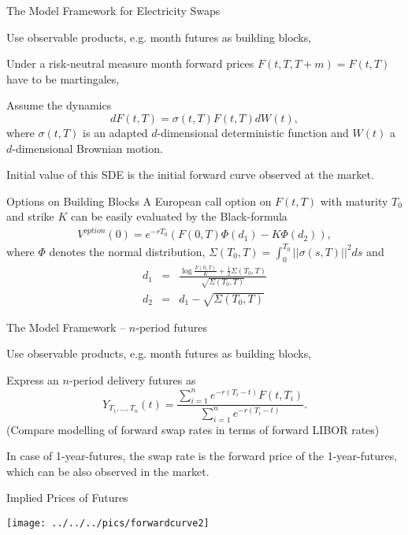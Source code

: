 {The Model Framework for Electricity Swaps}






	Use observable products, e.g. month futures as building blocks,


	Under a risk-neutral measure month forward prices $F(t,T,T+m)=F(t,T)$ have to be martingales,


	Assume the dynamics
$$dF(t,T)=\sigma(t,T)F(t,T)dW(t),$$
where $\sigma(t,T)$ is an adapted $d$-dimensional deterministic function and
$W(t)$ a $d$-dimensional Brownian motion.


	Initial value of this SDE is the initial forward curve observed at the market.





{Options on Building Blocks}
A European call option on $F(t,T)$ with maturity $T_0$ and strike
$K$ can be easily evaluated by the Black-formula
\begin{eqnarray}\label{eq:month-option}
V^{option}(0)=e^{-rT_0}\left(F(0,T)\Phi(d_1)-K\Phi (d_2)\right),
\end{eqnarray}
where $\Phi$ denotes the normal distribution, $\Sigma(T_0,T)=\int_0^{T_0}||\sigma(s,T)||^2ds$ and
\begin{eqnarray*}
d_1& = & \frac{\log \frac{F(0,T)}{K}+\frac{1}{2}\Sigma(T_0,T)}{\sqrt{\Sigma(T_0,T)}}\\
d_2 & = & d_1 - \sqrt{\Sigma(T_0,T)}
\end{eqnarray*}

{The Model Framework -- $n$-period futures}






	Use observable products, e.g. month futures as building blocks,


	Express an $n$-period delivery futures as
$$Y_{T_1, \ldots, T_n}(t)=\frac{\sum_{i=1}^n e^{-r(T_i-t)}F(t,T_i)}{\sum_{i=1}^n e^{-r(T_i-t)}}.$$
(Compare modelling of forward swap rates in terms of forward LIBOR rates)


	In case of 1-year-futures, the swap rate is the forward price of the 1-year-futures,
which can be also observed in the market.





{Implied Prices of Futures}
\begin{center}
\texttt{[image: ../../../pics/forwardcurve2]}
\end{center}

